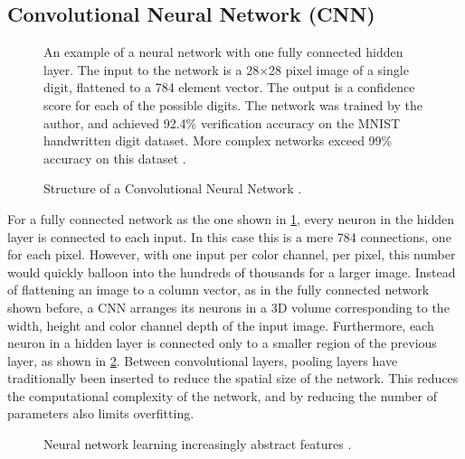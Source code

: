 \documentclass[\rootfolder/main.tex]{subfiles}
\begin{document}

\subsection{Convolutional Neural Network (CNN)}

\begin{figure}
    \caption[An example of a neural network with one fully connected hidden layer]%
        {An example of a neural network with one fully connected hidden layer. %
         The input to the network is a 28$\times$28 pixel image of a single digit, flattened to a 784 element vector. %
         The output is a confidence score for each of the possible digits. %
         The network was trained by the author, and achieved 92.4\% verification accuracy on the MNIST handwritten digit dataset. %
         More complex networks exceed 99\% accuracy on this dataset \cite{mnist2010}.\label{fig:mnist-net}}
\end{figure}

\begin{figure}
    \caption{Structure of a Convolutional Neural Network \cite{Mathworks}.\label{fig:cnn-classification}}
\end{figure}

For a fully connected network as the one shown in \cref{fig:mnist-net}, every neuron in the hidden layer is connected to each input.
In this case this is a mere 784 connections, one for each pixel.
However, with one input per color channel, per pixel, this number would quickly balloon into the hundreds of thousands for a larger image.
Instead of flattening an image to a column vector, as in the fully connected network shown before, a CNN arranges its neurons in a 3D volume corresponding to the width, height and color channel depth of the input image.
Furthermore, each neuron in a hidden layer is connected only to a smaller region of the previous layer, as shown in \cref{fig:cnn-classification}.
Between convolutional layers, pooling layers have traditionally been inserted to reduce the spatial size of the network.
This reduces the computational complexity of the network, and by reducing the number of parameters also limits overfitting.

\begin{figure}
    \caption{Neural network learning increasingly abstract features \cite{Brown2015}.\label{fig:abstract-features}}
\end{figure}
\end{document}
